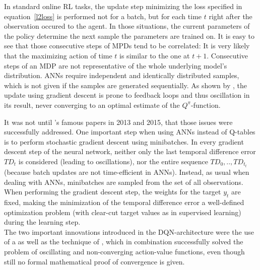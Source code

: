 In standard online RL tasks, the update step minimizing the loss specified in equation~\ref{l2loss} is performed not for a batch, but for each time $t$ right after the observation occured to the agent. 
In those situations, the current parameters of the policy determine the next sample the parameters are trained on. It is easy to see that those consecutive steps of MPDs tend to be correlated: It is very likely that the maximizing action of time $t$ is similar to the one at $t+1$. Consecutive steps of an MDP are not representative of the whole underlying model's distribution. ANNs require independent and identically distributed samples, which is not given if the samples are generated sequentially. As shown by \cite{john_n._tsitsiklis_analysis_1997}, the update using gradient descent is prone to feedback loops and thus oscillation in its result, never converging to an optimal estimate of the $Q^\pi$-function. 

It was not until 's famous papers in 2013\cite{mnih_playing_2013} and 2015\cite{mnih_human-level_2015}, that those issues were successfully addressed. One important step when using ANNs instead of Q-tables is to perform stochastic gradient descent using minibatches. In every gradient descent step of the neural network, neither only the last temporal difference error $TD_t$ is considered (leading to oscillations), nor the entire sequence $TD_0, .., TD_{t_t}$ (because batch updates are not time-efficient in ANNs). Instead, as usual when dealing with ANNs, minibatches are sampled from the set of all observations. When performing the gradient descent step, the weights for the target $y_t$ are fixed, making the minimization of the temporal difference error a well-defined optimization problem (with clear-cut target values as in supervised learning) during the learning step.\\


\noindent The two important innovations introduced in the DQN-architecture were the use of a  as well as the technique of , which in combination successfully solved the problem of oscillating and non-converging action-value functions, even though still no formal mathematical proof of convergence is given. %

